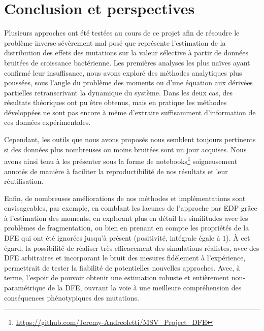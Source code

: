 \documentclass[12pt]{article}
\newcounter{prop}[section]
\begin{document}

\section{Conclusion et perspectives}

  Plusieurs approches ont été testées au cours de ce projet afin de résoudre le problème inverse sévèrement mal posé que représente l'estimation de la distribution des effets des mutations sur la valeur sélective à partir de données bruitées de croissance bactérienne. Les premières analyses les plus naïves ayant confirmé leur insuffisance, nous avons exploré des méthodes analytiques plus poussées, sous l'angle du problème des moments ou d'une équation aux dérivées partielles retranscrivant la dynamique du système. Dans les deux cas, des résultats théoriques ont pu être obtenus, mais en pratique les méthodes développées ne sont pas encore à même d'extraire suffisamment d'information de ces données expérimentales.
  
  Cependant, les outils que nous avons proposés nous semblent toujours pertinents si des données plus nombreuses ou moins bruitées sont un jour acquises. Nous avons ainsi tenu à les présenter sous la forme de notebooks\footnote{\url{https://github.com/Jeremy-Andreoletti/MSV_Project_DFE}} soigneusement annotés de manière à faciliter la reproductibilité de nos résultats et leur réutilisation.
  
  Enfin, de nombreuses améliorations de nos méthodes et implémentations sont envisageables, par exemple, en comblant les lacunes de l'approche par EDP grâce à l'estimation des moments, en explorant plus en détail les similitudes avec les problèmes de fragmentation, ou bien en prenant en compte les propriétés de la DFE qui ont été ignorées jusqu'à présent (positivité, intégrale égale à $1$). À cet égard, la possibilité de réaliser très efficacement des simulations réalistes, avec des DFE arbitraires et incorporant le bruit des mesures fidèlement à l'expérience, permettrait de tester la fiabilité de potentielles nouvelles approches. Avec, à terme, l'espoir de pouvoir obtenir une estimation robuste et entièrement non-paramétrique de la DFE, ouvrant la voie à une meilleure compréhension des conséquences phénotypiques des mutations.
\end{document}
